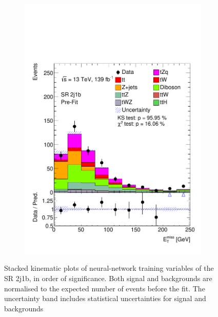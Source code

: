 \begin{figure}
\begin{subfigure}[b]{0.32\linewidth}
    \includegraphics[width=\linewidth]{ubonn-thesis/Chapters/Chapters_06/Figure/Input_distribution/SR_2j1b_MissEt.pdf} 
  \end{subfigure} 
  \caption{Stacked kinematic plots of neural-network training variables of the SR 2j1b, in order of significance. Both signal and backgrounds are normalised to the expected number of events before the fit. The uncertainty band includes statistical uncertainties for signal and backgrounds}
  \label{fig_signal2} 
\end{figure}

